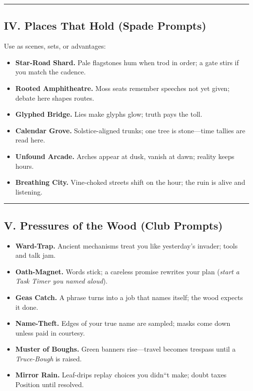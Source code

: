 \documentclass[11pt]{article}
\begin{document}
\medskip\hrule\medskip

\subsection{IV. Places That Hold (Spade Prompts)}
Use as scenes, sets, or advantages:
\begin{itemize}[leftmargin=*]
  \item \textbf{Star-Road Shard.} Pale flagstones hum when trod in order; a gate stirs if you match the cadence.
  \item \textbf{Rooted Amphitheatre.} Moss seats remember speeches not yet given; debate here shapes routes.
  \item \textbf{Glyphed Bridge.} Lies make glyphs glow; truth pays the toll.
  \item \textbf{Calendar Grove.} Solstice-aligned trunks; one tree is stone---time tallies are read here.
  \item \textbf{Unfound Arcade.} Arches appear at dusk, vanish at dawn; reality keeps hours.
  \item \textbf{Breathing City.} Vine-choked streets shift on the hour; the ruin is alive and listening.
\end{itemize}

\medskip\hrule\medskip

\subsection{V. Pressures of the Wood (Club Prompts)}
\begin{itemize}[leftmargin=*]
  \item \textbf{Ward-Trap.} Ancient mechanisms treat you like yesterday's invader; tools and talk jam.
  \item \textbf{Oath-Magnet.} Words stick; a careless promise rewrites your plan (\emph{start a Task Timer you named aloud}).
  \item \textbf{Geas Catch.} A phrase turns into a job that names itself; the wood expects it done.
  \item \textbf{Name-Theft.} Edges of your true name are sampled; masks come down unless paid in courtesy.
  \item \textbf{Muster of Boughs.} Green banners rise---travel becomes trespass until a \emph{Truce-Bough} is raised.
  \item \textbf{Mirror Rain.} Leaf-drips replay choices you didn``t make; doubt taxes Position until resolved.
\end{itemize}
\end{document}
